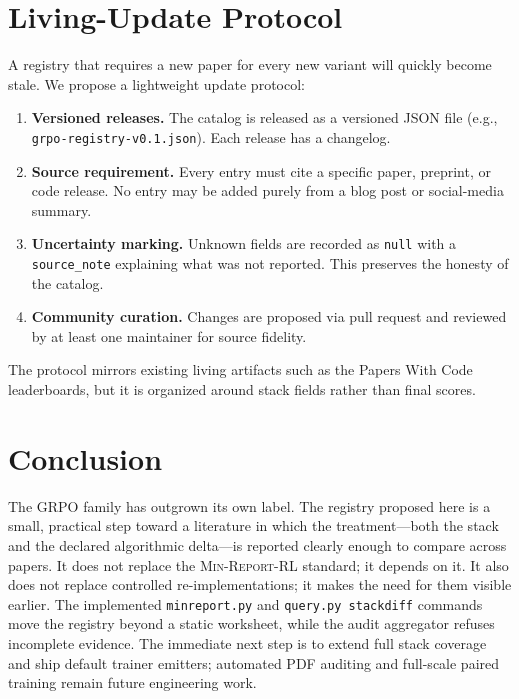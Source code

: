 \documentclass[11pt]{article}
\newcommand{\minreport}{\textsc{Min-Report-RL}}
\newcommand{\grpo}{\textsc{GRPO}}
\begin{document}
\section{Living-Update Protocol}
\label{sec:update}


A registry that requires a new paper for every new variant will quickly become
stale. We propose a lightweight update protocol:

\begin{enumerate}[leftmargin=1.6em, itemsep=2pt]
  \item \textbf{Versioned releases.} The catalog is released as a versioned
    JSON file (e.g., \texttt{grpo-registry-v0.1.json}). Each release has a
    changelog.
  \item \textbf{Source requirement.} Every entry must cite a specific paper,
    preprint, or code release. No entry may be added purely from a blog post or
    social-media summary.
  \item \textbf{Uncertainty marking.} Unknown fields are recorded as
    \texttt{null} with a \texttt{source\_note} explaining what was not
    reported. This preserves the honesty of the catalog.
  \item \textbf{Community curation.} Changes are proposed via pull request and
    reviewed by at least one maintainer for source fidelity.
\end{enumerate}

The protocol mirrors existing living artifacts such as the Papers With Code
leaderboards, but it is organized around stack fields rather than final scores.

\section{Conclusion}
\label{sec:conclusion}


The \grpo{} family has outgrown its own label. The registry proposed here is a
small, practical step toward a literature in which the treatment---both the
stack and the declared algorithmic delta---is reported clearly enough to
compare across papers. It does not replace the \minreport{} standard; it
depends on it. It also does not replace controlled re-implementations; it makes
the need for them visible earlier. The implemented \texttt{minreport.py} and
\texttt{query.py stackdiff} commands move the registry beyond a static
worksheet, while the audit aggregator refuses incomplete evidence. The
immediate next step is to extend full stack coverage and ship default trainer
emitters; automated PDF auditing and full-scale paired training remain future
engineering work.



\end{document}
